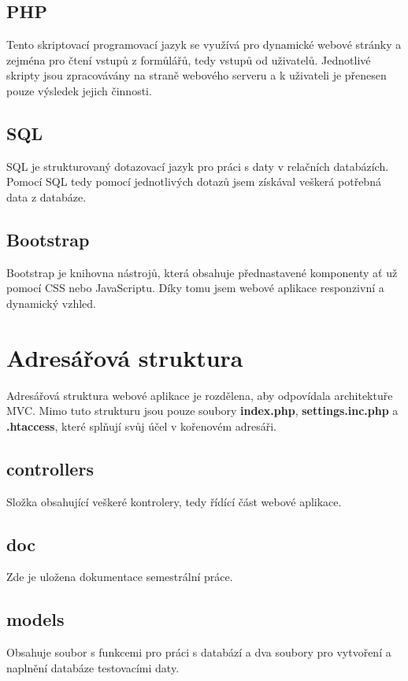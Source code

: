 \documentclass[czech,SP]{thesiskiv}
\begin{document}
\section{PHP}
\par
Tento skriptovací programovací jazyk se využívá pro dynamické webové stránky a zejména pro čtení vstupů z formůlářů, tedy
vstupů od uživatelů. Jednotlivé skripty jsou zpracovávány na straně webového serveru a k uživateli je přenesen
pouze výsledek jejich činnosti. 

\section{SQL}
\par
SQL je strukturovaný dotazovací jazyk pro práci s daty v relačních databázích. Pomocí SQL tedy pomocí jednotlivých dotazů jsem
získával veškerá potřebná data z databáze.

\section{Bootstrap}
\par
Bootstrap je knihovna nástrojů, která obsahuje přednastavené komponenty ať už pomocí CSS nebo JavaScriptu.
Díky tomu jsem webové aplikace responzivní a dynamický vzhled.

%
%
\chapter{Adresářová struktura}
\par
Adresářová struktura webové aplikace je rozdělena, aby odpovídala architektuře MVC. Mimo tuto strukturu jsou pouze soubory
\textbf{index.php}, \textbf{settings.inc.php} a \textbf{.htaccess}, které splňují svůj účel v kořenovém adresáři.

\section{controllers}
\par
Složka obsahující veškeré kontrolery, tedy řídící část webové aplikace.
\section{doc}
\par
Zde je uložena dokumentace semestrální práce.
\section{models}
\par
Obsahuje soubor s funkcemi pro práci s databází a dva soubory pro vytvoření a naplnění databáze testovacími daty.
\end{document}
